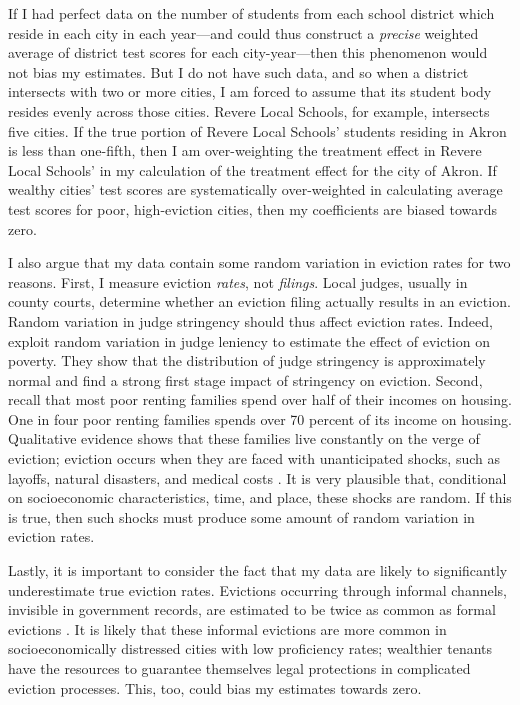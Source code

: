 \documentclass[12pt]{article}
\begin{document}
If I had perfect data on the number of students from each school district which reside in each city in each year—and could thus construct a \textit{precise} weighted average of district test scores for each city-year—then this phenomenon would not bias my estimates. But I do not have such data, and so when a district intersects with two or more cities, I am forced to assume that its student body resides evenly across those cities. Revere Local Schools, for example, intersects five cities. If the true portion of Revere Local Schools' students residing in Akron is less than one-fifth, then I am over-weighting the treatment effect in Revere Local Schools' in my calculation of the treatment effect for the city of Akron. If wealthy cities' test scores are systematically over-weighted in calculating average test scores for poor, high-eviction cities, then my coefficients are biased towards zero.


I also argue that my data contain some random variation in eviction rates for two reasons. First, I measure eviction \textit{rates}, not \textit{filings}. Local judges, usually in county courts, determine whether an eviction filing actually results in an eviction. Random variation in judge stringency should thus affect eviction rates. Indeed, \cite{humphries_does_2019} exploit random variation in judge leniency to estimate the effect of eviction on poverty. They show that the distribution of judge stringency is approximately normal and find a strong first stage impact of stringency on eviction. Second, recall that most poor renting families spend over half of their incomes on housing. One in four poor renting families spends over 70 percent of its income on housing. Qualitative evidence shows that these families live constantly on the verge of eviction; eviction occurs when they are faced with unanticipated shocks, such as layoffs, natural disasters, and medical costs \cite{desmond_evicted:_2017}. It is very plausible that, conditional on socioeconomic characteristics, time, and place, these shocks are random. If this is true, then such shocks must produce some amount of random variation in eviction rates.


Lastly, it is important to consider the fact that my data are likely to significantly underestimate true eviction rates. Evictions occurring through informal channels, invisible in government records, are estimated to be twice as common as formal evictions \citep{desmond_forced_2015}. It is likely that these informal evictions are more common in socioeconomically distressed cities with low proficiency rates; wealthier tenants have the resources to guarantee themselves legal protections in complicated eviction processes. This, too, could bias my estimates towards zero. 
\end{document}
